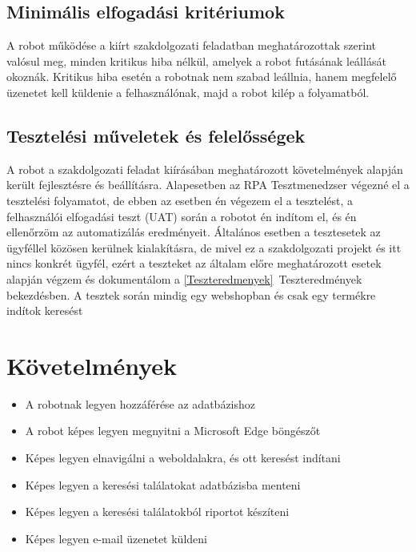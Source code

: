 \documentclass[
]{thesis-ekf}
\theoremstyle{definition}
\theoremstyle{remark}
\begin{document}
\subsection{Minimális elfogadási kritériumok}
A robot működése a kiírt szakdolgozati feladatban meghatározottak szerint valósul meg, minden kritikus hiba nélkül, amelyek a robot futásának leállását okoznák. Kritikus hiba esetén a robotnak nem szabad leállnia, hanem megfelelő üzenetet kell küldenie a felhasználónak, majd a robot kilép a folyamatból.
\subsection{Tesztelési műveletek és felelősségek}
A robot a szakdolgozati feladat kiírásában meghatározott követelmények alapján került fejlesztésre és beállításra. Alapesetben az RPA Tesztmenedzser végezné el a tesztelési folyamatot, de ebben az esetben én végezem el a tesztelést, a felhasználói elfogadási teszt (UAT) során a robotot én indítom el, és én ellenőrzöm az automatizálás eredményeit. Általános esetben a tesztesetek az ügyféllel közösen kerülnek kialakításra, de mivel ez a szakdolgozati projekt és itt nincs konkrét ügyfél, ezért a teszteket az általam előre meghatározott esetek alapján végzem és dokumentálom a \ref{Teszteredmenyek}~Teszteredmények bekezdésben. A tesztek során mindig egy webshopban és csak egy termékre indítok keresést

\section{Követelmények}
\begin{itemize} 
	\item A robotnak legyen hozzáférése az adatbázishoz
	\item A robot képes legyen megnyitni a Microsoft Edge böngészőt
	\item Képes legyen elnavigálni a weboldalakra, és ott keresést indítani \item Képes legyen a keresési találatokat adatbázisba menteni 
	\item Képes legyen a keresési találatokból riportot készíteni 
	\item Képes legyen e-mail üzenetet küldeni 
\end{itemize}
\end{document}
